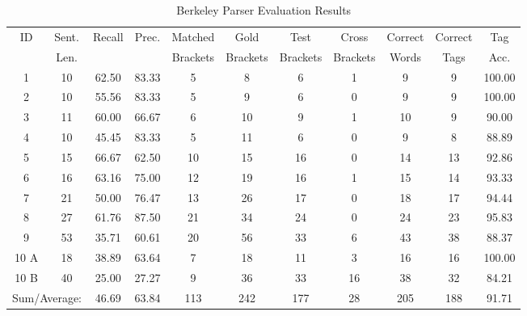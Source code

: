 \begin{table*}[htbp!]
\centering
\begin{tabular}{@{}ccccccccccc@{}}
\toprule
ID & Sent. & Recall & Prec. & Matched & Gold & Test & Cross & Correct & Correct & Tag \\
 & Len. & & & Brackets & Brackets & Brackets & Brackets & Words & Tags & Acc. \\
\midrule
1 & 10 & 62.50 & 83.33 & 5 & 8 & 6 & 1 & 9 & 9 & 100.00 \\
2 & 10 & 55.56 & 83.33 & 5 & 9 & 6 & 0 & 9 & 9 & 100.00 \\
3 & 11 & 60.00 & 66.67 & 6 & 10 & 9 & 1 & 10 & 9 & 90.00 \\
4 & 10 & 45.45 & 83.33 & 5 & 11 & 6 & 0 & 9 & 8 & 88.89 \\
5 & 15 & 66.67 & 62.50 & 10 & 15 & 16 & 0 & 14 & 13 & 92.86 \\
6 & 16 & 63.16 & 75.00 & 12 & 19 & 16 & 1 & 15 & 14 & 93.33 \\
7 & 21 & 50.00 & 76.47 & 13 & 26 & 17 & 0 & 18 & 17 & 94.44 \\
8 & 27 & 61.76 & 87.50 & 21 & 34 & 24 & 0 & 24 & 23 & 95.83 \\
9 & 53 & 35.71 & 60.61 & 20 & 56 & 33 & 6 & 43 & 38 & 88.37 \\
10 A & 18 & 38.89 & 63.64 & 7 & 18 & 11 & 3 & 16 & 16 & 100.00 \\
10 B & 40 & 25.00 & 27.27 & 9 & 36 & 33 & 16 & 38 & 32 & 84.21 \\
\midrule
\multicolumn{2}{l}{Sum/Average:} & 46.69 & 63.84 & 113 & 242 & 177 & 28 & 205 & 188 & 91.71 \\
\bottomrule
\end{tabular}
\caption{Berkeley Parser Evaluation Results}
\label{{tab:parser_eval}}
\end{table*}
